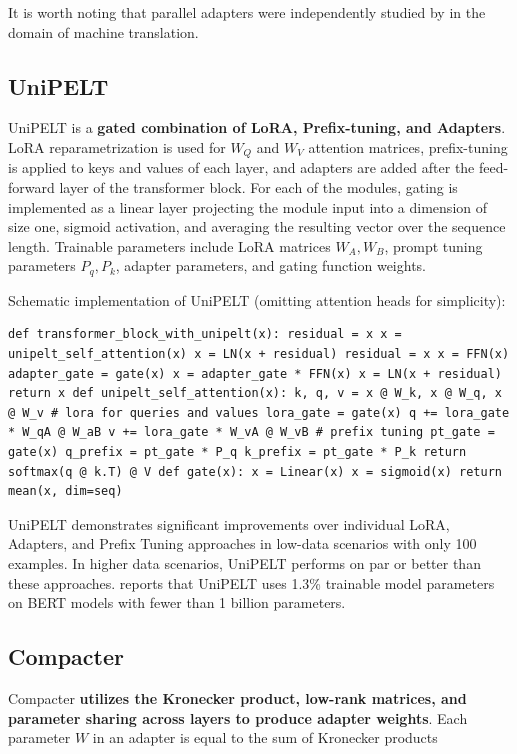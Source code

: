 It is worth noting that parallel adapters were independently studied by \citet{parallel_adapter2} in the domain of machine translation.

\subsection{UniPELT}
\label{sec:unipelt}
UniPELT \citep{unipelt} is a \textbf{gated combination of LoRA, Prefix-tuning, and Adapters}. LoRA reparametrization is used for $W_Q$ and $W_V$ attention matrices, prefix-tuning is applied to keys and values of each layer, and adapters are added after the feed-forward layer of the transformer block. For each of the modules, gating is implemented as a linear layer projecting the module input into a dimension of size one, sigmoid activation, and averaging the resulting vector over the sequence length. Trainable parameters include LoRA matrices $W_A, W_B$, prompt tuning parameters $P_q, P_k$, adapter parameters, and gating function weights.

Schematic implementation of UniPELT (omitting attention heads for simplicity):

\begin{lstlisting}
def transformer_block_with_unipelt(x): residual = x x = unipelt_self_attention(x) x = LN(x + residual) residual = x x = FFN(x) adapter_gate = gate(x) x = adapter_gate * FFN(x) x = LN(x + residual) return x def unipelt_self_attention(x): k, q, v = x @ W_k, x @ W_q, x @ W_v # lora for queries and values lora_gate = gate(x) q += lora_gate * W_qA @ W_aB v += lora_gate * W_vA @ W_vB # prefix tuning pt_gate = gate(x) q_prefix = pt_gate * P_q k_prefix = pt_gate * P_k return softmax(q @ k.T) @ V def gate(x): x = Linear(x) x = sigmoid(x) return mean(x, dim=seq)
\end{lstlisting}

UniPELT demonstrates significant improvements over individual LoRA, Adapters, and Prefix Tuning approaches in low-data scenarios with only 100 examples. In higher data scenarios, UniPELT performs on par or better than these approaches. \citet{unipelt} reports that UniPELT uses 1.3\% trainable model parameters on BERT models with fewer than 1 billion parameters.

\subsection{Compacter}
\label{sec:compacter}
Compacter \citep{compacter} \textbf{utilizes the Kronecker product, low-rank matrices, and parameter sharing across layers to produce adapter weights}. Each parameter $W$ in an adapter is equal to the sum of Kronecker products

